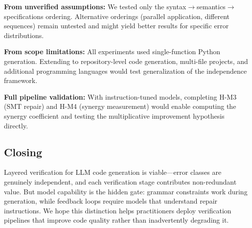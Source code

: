 \textbf{From unverified assumptions:} We tested only the syntax$\rightarrow$semantics$\rightarrow$specifications ordering. Alternative orderings (parallel application, different sequences) remain untested and might yield better results for specific error distributions.

\textbf{From scope limitations:} All experiments used single-function Python generation. Extending to repository-level code generation, multi-file projects, and additional programming languages would test generalization of the independence framework.

\textbf{Full pipeline validation:} With instruction-tuned models, completing H-M3 (SMT repair) and H-M4 (synergy measurement) would enable computing the synergy coefficient and testing the multiplicative improvement hypothesis directly.

\subsection{Closing}

Layered verification for LLM code generation is viable---error classes are genuinely independent, and each verification stage contributes non-redundant value. But model capability is the hidden gate: grammar constraints work during generation, while feedback loops require models that understand repair instructions. We hope this distinction helps practitioners deploy verification pipelines that improve code quality rather than inadvertently degrading it.
